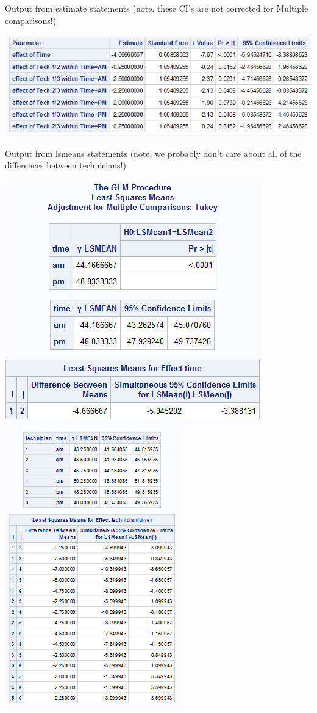 \begin{enumerate}
Output from estimate statements (note, these CI's are not corrected for Multiple comparisons!)

\begin{center}
\includegraphics[scale=0.8]{NestedSAS5}
\end{center}

\newpage

Output from lsmeans statements (note, we probably don't care about all of the differences between technicians!)

\begin{center}
\includegraphics[scale=0.7]{NestedSAS3}\includegraphics[scale=1.1]{NestedSAS4}
\end{center}

\end{enumerate}